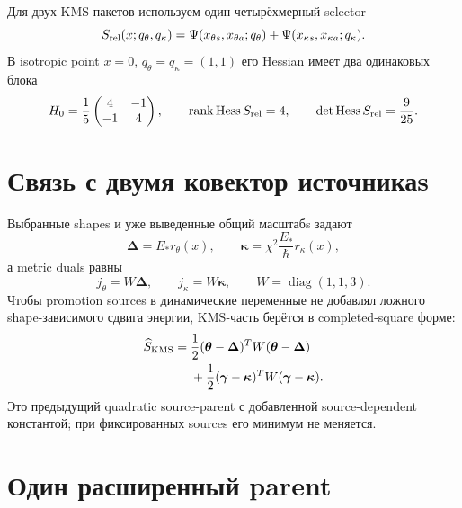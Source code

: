 Для двух KMS-пакетов используем один четырёхмерный selector
\begin{equation}
 S_{\rm rel}(x;q_\theta,q_\kappa)
 =\Psi(x_{\theta s},x_{\theta a};q_\theta)
 +\Psi(x_{\kappa s},x_{\kappa a};q_\kappa).
 \label{eq:v9-kms-shape-selector-parent}
\end{equation}
В isotropic point $x=0$, $q_\theta=q_\kappa=(1,1)$ его Hessian имеет два
одинаковых блока
\begin{equation}
 H_0=\frac15\begin{pmatrix}4&-1\\-1&4\end{pmatrix},
 \qquad
 \operatorname{rank}\operatorname{Hess} S_{\rm rel}=4,
 \qquad
 \det\operatorname{Hess} S_{\rm rel}=\frac9{25}.
 \label{eq:v9-kms-shape-selector-hessian}
\end{equation}

\section{Связь с двумя ковектор источникаs}

Выбранные shapes и уже выведенные общий масштабs задают
\begin{equation}
 \boldsymbol\Delta=E_*r_\theta(x),
 \qquad
 \boldsymbol\kappa=\chi^2\frac{E_*}{\hbar}r_\kappa(x),
 \label{eq:v9-kms-shape-selector-physical-data}
\end{equation}
а metric duals равны
\begin{equation}
 j_\theta=W\boldsymbol\Delta,
 \qquad
 j_\kappa=W\boldsymbol\kappa,
 \qquad W=\operatorname{diag}(1,1,3).
 \label{eq:v9-kms-shape-selector-source-covectors}
\end{equation}
Чтобы promotion sources в динамические переменные не добавлял ложного
shape-зависимого сдвига энергии, KMS-часть берётся в completed-square форме:
\begin{equation}
 \begin{aligned}
 \widehat S_{\rm KMS}={}&
 \frac12(\boldsymbol\theta-\boldsymbol\Delta)^TW
 (\boldsymbol\theta-\boldsymbol\Delta)\\
 &+\frac12(\boldsymbol\gamma-\boldsymbol\kappa)^TW
 (\boldsymbol\gamma-\boldsymbol\kappa).
 \end{aligned}
 \label{eq:v9-kms-shape-selector-completed-square}
\end{equation}
Это предыдущий quadratic source-parent с добавленной source-dependent
константой; при фиксированных sources его минимум не меняется.

\section{Один расширенный parent}

